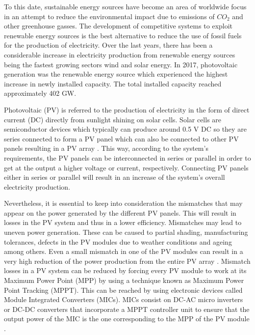 To this date, sustainable energy sources have become an area of worldwide focus in an attempt to reduce the environmental impact due to emissions of $CO_{2}$ and other greenhouse gasses. The development of competitive systems to exploit renewable energy sources is the best alternative to reduce the use of fossil fuels for the production of electricity. Over the last years, there has been a considerable increase in electricity production from renewable energy sources being the fastest growing sectors wind and solar energy. In 2017, photovoltaic generation was the renewable energy source which experienced the highest increase in newly installed capacity. The total installed capacity reached approximately 402 GW\cite{global}. %

Photovoltaic (PV) is referred to the production of electricity in the form of direct current (DC) directly from sunlight shining on solar cells. Solar cells are semiconductor devices which typically can produce around 0.5 V DC so they are series connected to form a PV panel which can also be connected to other PV panels resulting in a PV array \cite{handbook}. This way, according to the system's requirements, the PV panels can be interconnected in series or parallel in order to get at the output a higher voltage or current, respectively. Connecting PV panels either in series or parallel will result in an increase of the system's overall electricity production. %

Nevertheless, it is essential to keep into consideration the mismatches that may appear on the power generated by the different PV panels. This will result in losses in the PV system and thus in a lower efficiency. Mismatches may lead to uneven power generation. These can be caused to partial shading, manufacturing tolerances, defects in the PV modules due to weather conditions and ageing among others. Even a small mismatch in one of the PV modules can result in a very high reduction of the power production from the entire PV array \cite{MPPmismatch}. Mismatch losses in a PV system can be reduced by forcing every PV module to work at its Maximum Power Point (MPP) by using a technique known as Maximum Power Point Tracking (MPPT). This can be reached by using electronic devices called Module Integrated Converters (MICs). MICs consist on DC-AC micro inverters or DC-DC converters that incorporate a MPPT controller unit to ensure that the output power of the MIC is the one corresponding to the MPP of the PV module \cite{MPPmismatch}.%